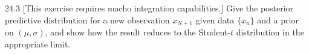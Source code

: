 \documentclass[12pt, a4paper]{article}
\begin{document}
\begin{prob}{24.3}
[This exercise requires macho integration capabilities.] Give the posterior predictive distribution for a new observation $x_{N+1}$ given data $\{x_n\}$ and a prior on $(\mu,\sigma)$, and show how the result reduces to the Student-\(t\) distribution in the appropriate limit.
\end{prob}
\begin{sol}
\end{sol}
\bigskip
\end{document}
